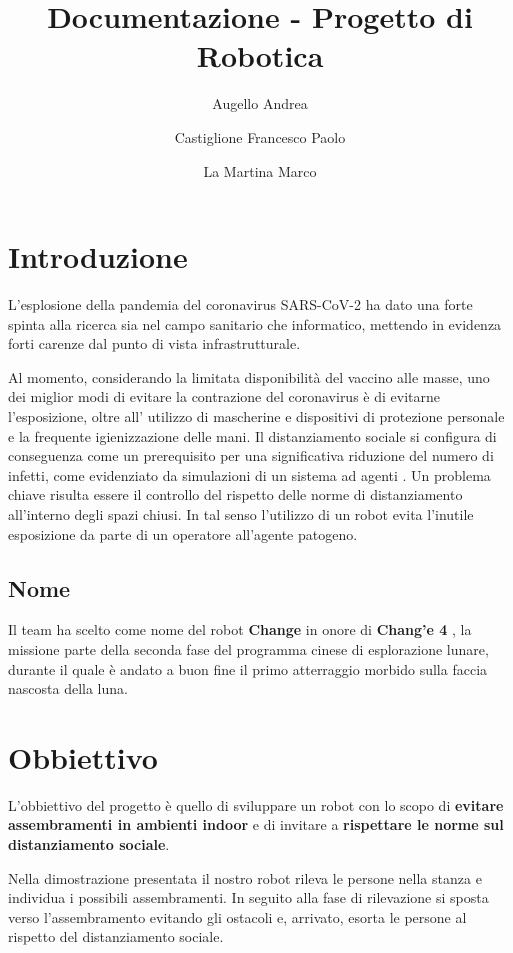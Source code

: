 \documentclass[a4paper]{article}
\begin{document}
	\title{Documentazione - Progetto di Robotica}
	\author{Augello Andrea \and Castiglione Francesco Paolo \and La Martina Marco}
	\maketitle
	\tableofcontents


	\section{Introduzione}\label{sec:Introduzione}
	L'esplosione della pandemia del coronavirus SARS-CoV-2 ha dato una forte
	spinta alla ricerca sia nel campo sanitario che informatico, mettendo in
	evidenza forti carenze dal punto di vista infrastrutturale.
	
	
	Al momento, considerando la limitata disponibilità del vaccino alle masse,
	uno dei miglior modi di evitare la contrazione del coronavirus è di
	evitarne l'esposizione, oltre all' utilizzo di mascherine e dispositivi di
	protezione personale e la frequente igienizzazione delle mani. Il
	distanziamento sociale si configura di conseguenza come un prerequisito per
	una significativa riduzione del numero di infetti, come evidenziato da
	simulazioni di un sistema ad agenti \cite{silva2020covid}. Un problema
	chiave risulta essere il controllo del rispetto delle norme di
	distanziamento all'interno degli spazi chiusi. In tal senso l'utilizzo di
	un robot evita l'inutile esposizione da parte di un operatore all'agente
	patogeno.
	
	\subsection{Nome}\label{subsec:Nome}
	Il team ha scelto come nome del robot \textbf{Change} in onore di \textbf{Chang'e 4}
	\cite{change4}, la missione parte della seconda fase del programma cinese
	di esplorazione lunare, durante il quale è andato a buon fine il primo
	atterraggio morbido sulla faccia nascosta della luna. 
	
	\section{Obbiettivo}\label{sec:Obbiettivo} 
	L'obbiettivo del progetto è quello di sviluppare un robot con lo scopo di
	\textbf{evitare assembramenti in ambienti indoor} e di invitare a
	\textbf{rispettare le norme sul distanziamento sociale}. 
	
	Nella dimostrazione presentata il nostro robot rileva le persone nella
	stanza e individua i possibili assembramenti. In seguito alla fase di
	rilevazione si sposta verso l'assembramento evitando gli ostacoli e,
	arrivato, esorta le persone al rispetto del distanziamento sociale.
	
\end{document}
